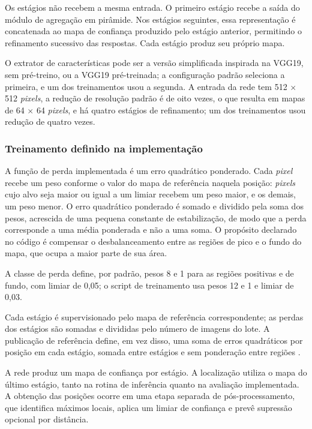 Os est\'agios n\~ao recebem a mesma entrada. O primeiro est\'agio recebe a sa\'ida do m\'odulo de agrega\c{c}\~ao em pir\^amide. Nos est\'agios seguintes, essa representa\c{c}\~ao \'e concatenada ao mapa de confian\c{c}a produzido pelo est\'agio anterior, permitindo o refinamento sucessivo das respostas. Cada est\'agio produz seu pr\'oprio mapa.

O extrator de caracter\'isticas pode ser a vers\~ao simplificada inspirada na VGG19, sem pr\'e-treino, ou a VGG19 pr\'e-treinada; a configura\c{c}\~ao padr\~ao seleciona a primeira, e um dos treinamentos usou a segunda. A entrada da rede tem 512 $\times$ 512 \textit{pixels}, a redu\c{c}\~ao de resolu\c{c}\~ao padr\~ao \'e de oito vezes, o que resulta em mapas de 64 $\times$ 64 \textit{pixels}, e h\'a quatro est\'agios de refinamento; um dos treinamentos usou redu\c{c}\~ao de quatro vezes.

\subsubsection*{Treinamento definido na implementa\c{c}\~ao}

A fun\c{c}\~ao de perda implementada \'e um erro quadr\'atico ponderado. Cada \textit{pixel} recebe um peso conforme o valor do mapa de refer\^encia naquela posi\c{c}\~ao: \textit{pixels} cujo alvo seja maior ou igual a um limiar recebem um peso maior, e os demais, um peso menor. O erro quadr\'atico ponderado \'e somado e dividido pela soma dos pesos, acrescida de uma pequena constante de estabiliza\c{c}\~ao, de modo que a perda corresponde a uma m\'edia ponderada e n\~ao a uma soma. O prop\'osito declarado no c\'odigo \'e compensar o desbalanceamento entre as regi\~oes de pico e o fundo do mapa, que ocupa a maior parte de sua \'area.

A classe de perda define, por padr\~ao, pesos 8 e 1 para as regi\~oes positivas e de fundo, com limiar de 0,05; o script de treinamento usa pesos 12 e 1 e limiar de 0,03.

Cada est\'agio \'e supervisionado pelo mapa de refer\^encia correspondente; as perdas dos est\'agios s\~ao somadas e divididas pelo n\'umero de imagens do lote. A publica\c{c}\~ao de refer\^encia define, em vez disso, uma soma de erros quadr\'aticos por posi\c{c}\~ao em cada est\'agio, somada entre est\'agios e sem pondera\c{c}\~ao entre regi\~oes \citep{arruda2022}.

A rede produz um mapa de confian\c{c}a por est\'agio. A localiza\c{c}\~ao utiliza o mapa do \'ultimo est\'agio, tanto na rotina de infer\^encia quanto na avalia\c{c}\~ao implementada. A obten\c{c}\~ao das posi\c{c}\~oes ocorre em uma etapa separada de p\'os-processamento, que identifica m\'aximos locais, aplica um limiar de confian\c{c}a e prev\^e supress\~ao opcional por dist\^ancia.

